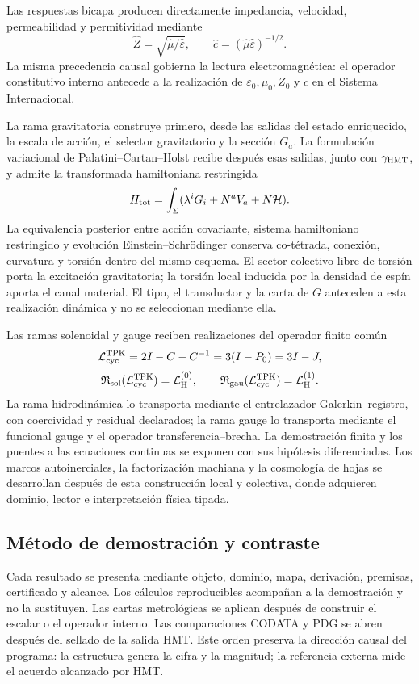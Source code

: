 Las respuestas bicapa producen directamente impedancia, velocidad,
permeabilidad y permitividad mediante
\[
 \widehat Z=\sqrt{\widehat\mu/\widehat\varepsilon},
 \qquad
 \widehat c=(\widehat\mu\widehat\varepsilon)^{-1/2}.
\]
La misma precedencia causal gobierna la lectura electromagnética: el operador
constitutivo interno antecede a la realización de
\(\varepsilon_0,\mu_0,Z_0\) y \(c\) en el Sistema Internacional.

La rama gravitatoria construye primero, desde las salidas del estado
enriquecido, la escala de acción, el selector gravitatorio y la sección
\(G_a\). La formulación variacional de Palatini--Cartan--Holst recibe después
esas salidas, junto con \(\gamma_{\rm HMT}\), y admite la transformada
hamiltoniana restringida
\[
 H_{\rm tot}=\int_\Sigma
 (\lambda^i G_i+N^a V_a+N\mathcal H).
\]
La equivalencia posterior entre acción covariante, sistema hamiltoniano restringido y
evolución Einstein--Schrödinger conserva co-tétrada, conexión, curvatura y
torsión dentro del mismo esquema. El sector colectivo libre de torsión porta
la excitación gravitatoria; la torsión local inducida por la densidad de espín
aporta el canal material. El tipo, el transductor y la carta de \(G\) anteceden
a esta realización dinámica y no se seleccionan mediante ella.

Las ramas solenoidal y gauge reciben realizaciones del operador finito común
\[
 \mathcal L_{\rm cyc}^{\rm TPK}=2I-C-C^{-1}=3(I-P_0)=3I-J,
\]
\[
 \mathfrak R_{\rm sol}(\mathcal L_{\rm cyc}^{\rm TPK})
 =\mathcal L_{\rm H}^{(0)},\qquad
 \mathfrak R_{\rm gau}(\mathcal L_{\rm cyc}^{\rm TPK})
 =\mathcal L_{\rm H}^{(1)}.
\]
La rama hidrodinámica lo transporta mediante el entrelazador
Galerkin--registro, con coercividad y residual declarados; la rama gauge lo
transporta mediante el funcional gauge y el operador
transferencia--brecha. La demostración finita y los puentes a las ecuaciones
continuas se exponen con sus hipótesis diferenciadas. Los marcos
autoinerciales, la factorización machiana y la cosmología de hojas se
desarrollan después de esta construcción local y colectiva, donde adquieren
dominio, lector e interpretación física tipada.

\subsection*{Método de demostración y contraste}

Cada resultado se presenta mediante objeto, dominio, mapa, derivación,
premisas, certificado y alcance. Los cálculos reproducibles acompañan a la
demostración y no la sustituyen. Las cartas metrológicas se aplican después
de construir el escalar o el operador interno. Las comparaciones CODATA y PDG
se abren después del sellado de la salida HMT\@. Este orden preserva la
dirección causal del programa: la estructura genera la cifra y la magnitud;
la referencia externa mide el acuerdo alcanzado por HMT\@.

